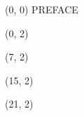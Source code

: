 \documentclass[10pt]{article}
\begin{document}
\begin{textblock}{31}(0, 0)
\center\huge PREFACE
\end{textblock}

\begin{textblock}{6}(0, 2)
    {}
\end{textblock}

\begin{textblock}{7}(7, 2)
    {}
\end{textblock}

\begin{textblock}{5}(15, 2)
    {}
\end{textblock}

\begin{textblock}{10}(21, 2)
    {}
\end{textblock}
\end{document}
